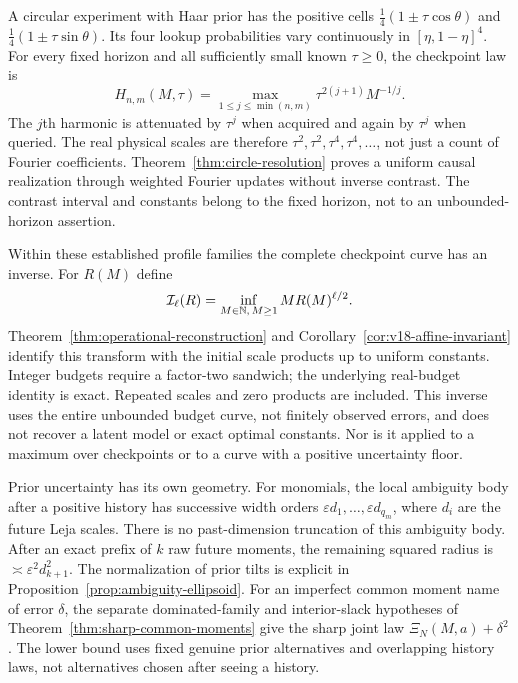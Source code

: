 A circular experiment with Haar prior has the positive cells
$\tfrac14(1\pm\tau\cos\theta)$ and
$\tfrac14(1\pm\tau\sin\theta)$. Its four lookup probabilities vary
continuously in $[\eta,1-\eta]^4$. For every fixed horizon and all
sufficiently small known $\tau\ge0$, the checkpoint law is
\[
 H_{n,m}(M,\tau)=
   \max_{1\le j\le\min(n,m)}\tau^{2(j+1)}M^{-1/j}.
\]
The $j$th harmonic is attenuated by $\tau^j$ when acquired and again
by $\tau^j$ when queried. The real physical scales are therefore
$\tau^2,\tau^2,\tau^4,\tau^4,\ldots$, not just a count of Fourier
coefficients. Theorem~\ref{thm:circle-resolution} proves a uniform
causal realization through weighted Fourier updates without inverse
contrast. The contrast interval and constants belong to the fixed
horizon, not to an unbounded-horizon assertion.

Within these established profile families the complete checkpoint curve
has an inverse. For $R(M)$ define
\[
 \mathcal I_\ell(R)=\inf_{M\in\mathbb N,\,M\ge1}M R(M)^{\ell/2}.
\]
Theorem~\ref{thm:operational-reconstruction} and
Corollary~\ref{cor:v18-affine-invariant} identify this transform with
the initial scale products up to uniform constants. Integer budgets
require a factor-two sandwich; the underlying real-budget identity is
exact. Repeated scales and zero products are included. This inverse
uses the entire unbounded budget curve, not finitely observed errors,
and does not recover a latent model or exact optimal constants. Nor is
it applied to a maximum over checkpoints or to a curve with a positive
uncertainty floor.

Prior uncertainty has its own geometry. For monomials, the local
ambiguity body after a positive history has successive width orders
$\varepsilon d_1,\ldots,\varepsilon d_{q_m}$, where $d_i$ are the
future Leja scales. There is no past-dimension truncation of this
ambiguity body. After an exact prefix of $k$ raw future moments,
the remaining squared radius is $\asymp\varepsilon^2d_{k+1}^2$.
The normalization of prior tilts is explicit in
Proposition~\ref{prop:ambiguity-ellipsoid}. For an imperfect common
moment name of error $\delta$, the separate dominated-family and
interior-slack hypotheses of Theorem~\ref{thm:sharp-common-moments}
give the sharp joint law $\Xi_N(M,a)+\delta^2$. The lower bound
uses fixed genuine prior alternatives and overlapping history laws,
not alternatives chosen after seeing a history.


